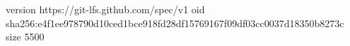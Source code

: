 version https://git-lfs.github.com/spec/v1
oid sha256:e4f1ee978790d10ced1bce918fd28df15769167f09df03cc0037d18350b8273c
size 5500
